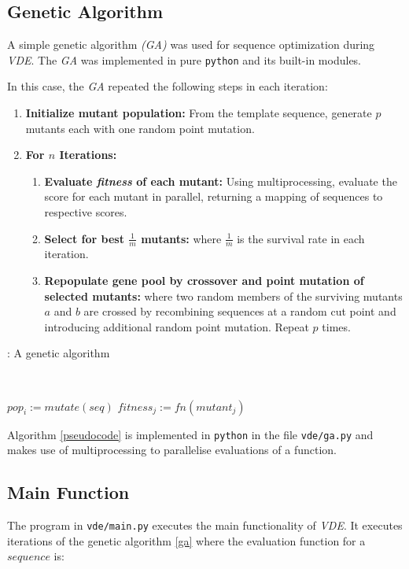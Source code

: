 \documentclass[16pt]{article}
\begin{document}
\subsection{Genetic Algorithm \label{ga}}

A simple genetic algorithm \textit{(GA)} was used for sequence optimization during \textit{VDE}.
The \textit{GA} was implemented in pure \texttt{python} and its built-in modules.

In this case, the \textit{GA} repeated the following steps in each iteration:
\begin{enumerate}
	\item \textbf{Initialize mutant population:} From the template sequence, generate $p$ mutants each with one random point mutation.
	\item \textbf{For $n$ Iterations:}
		\begin{enumerate}
	\item \textbf{Evaluate \textit{fitness} of each mutant:\label{gaeval}} Using multiprocessing, evaluate the score for each mutant in parallel, returning a mapping of sequences to respective scores.
	\item \textbf{Select for best $\frac{1}{m}$ mutants:} where $\frac{1}{m}$ is the survival rate in each iteration.
	\item \textbf{Repopulate gene pool by crossover and point mutation of selected mutants:} where two random members of the surviving mutants $a$ and $b$ are crossed by recombining sequences at a random cut point and introducing additional random point mutation.
		Repeat $p$ times.
		\end{enumerate}
\end{enumerate}

\begin{algorithm}
	\caption{\label{pseudocode}: A genetic algorithm}
	\
	\begin{algorithmic}
			\State $pop_i := mutate(seq)$ 
		\EndFor
				\State $fitness_j := fn(mutant_j)$
			\EndFor
		\EndFor
		\EndProcedure
	\end{algorithmic}
\end{algorithm}

Algorithm \ref{pseudocode} is implemented in \texttt{python} in the file \texttt{vde/ga.py} and makes use of multiprocessing to parallelise evaluations of a function.

\subsection{Main Function \label{main}}
The program in \texttt{vde/main.py} executes the main functionality of \textit{VDE}.
It executes iterations of the genetic algorithm \ref{ga} where the evaluation function for a $sequence $ is:
\end{document}
